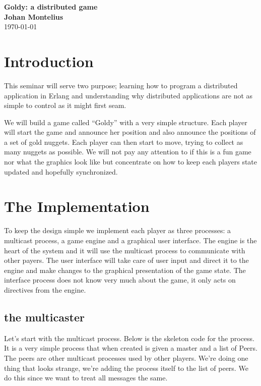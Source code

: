 \documentclass[a4paper,11pt]{article}
\newcommand{\nnsection}[1]{
\section*{#1}
\addcontentsline{toc}{section}{#1}
}
\begin{document}
\begin{center}
\vspace{20pt}
\textbf{\large Goldy: a distributed game}\\
\vspace{10pt}
\textbf{Johan Montelius}\\
\vspace{10pt}
\today{}
\end{center}

\nnsection{Introduction}

This seminar will serve two purpose; learning how to program a
distributed application in Erlang and understanding why distributed
applications are not as simple to control as it might first seam.

We will build a game called ``Goldy'' with a very simple
structure. Each player will start the game and announce her position
and also announce the positions of a set of gold nuggets. Each player
can then start to move, trying to collect as many nuggets as
possible. We will not pay any attention to if this is a fun game nor
what the graphics look like but concentrate on how to keep each
players state updated and hopefully synchronized.

\section{The Implementation}

To keep the design simple we implement each player as three processes:
a multicast process, a game engine and a graphical user interface. The
engine is the heart of the system and it will use the multicast process to
communicate with other payers. The user interface will take care of user input
and direct it to the engine and make changes to the graphical
presentation of the game state. The interface process does not know very
much about the game, it only acts on directives from the engine.

\subsection{the multicaster}

Let's start with the multicast process. Below is the skeleton code for
the process. It is a very simple process that when created is given a
master and a list of Peers. The peers are other multicast processes
used by other players. We're doing one thing that looks strange, we're
adding the process itself to the list of peers. We do this since we
want to treat all messages the same.
\end{document}
